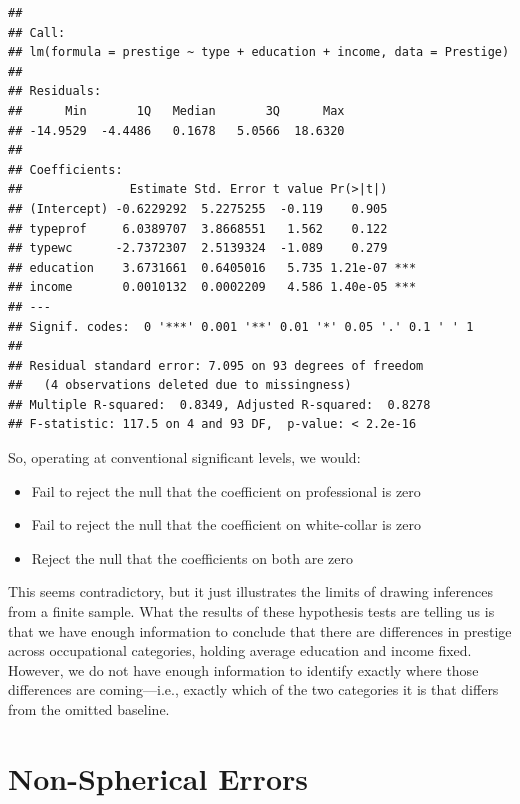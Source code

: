 \documentclass[12pt,oneside,openany]{book}
\providecommand{\tightlist}{%
  \setlength{\itemsep}{0pt}\setlength{\parskip}{0pt}}
\begin{document}
\begin{verbatim}
## 
## Call:
## lm(formula = prestige ~ type + education + income, data = Prestige)
## 
## Residuals:
##      Min       1Q   Median       3Q      Max 
## -14.9529  -4.4486   0.1678   5.0566  18.6320 
## 
## Coefficients:
##               Estimate Std. Error t value Pr(>|t|)    
## (Intercept) -0.6229292  5.2275255  -0.119    0.905    
## typeprof     6.0389707  3.8668551   1.562    0.122    
## typewc      -2.7372307  2.5139324  -1.089    0.279    
## education    3.6731661  0.6405016   5.735 1.21e-07 ***
## income       0.0010132  0.0002209   4.586 1.40e-05 ***
## ---
## Signif. codes:  0 '***' 0.001 '**' 0.01 '*' 0.05 '.' 0.1 ' ' 1
## 
## Residual standard error: 7.095 on 93 degrees of freedom
##   (4 observations deleted due to missingness)
## Multiple R-squared:  0.8349, Adjusted R-squared:  0.8278 
## F-statistic: 117.5 on 4 and 93 DF,  p-value: < 2.2e-16
\end{verbatim}

So, operating at conventional significant levels, we would:

\begin{itemize}
\tightlist
\item
  Fail to reject the null that the coefficient on professional is zero
\item
  Fail to reject the null that the coefficient on white-collar is zero
\item
  Reject the null that the coefficients on both are zero
\end{itemize}

This seems contradictory, but it just illustrates the limits of drawing
inferences from a finite sample. What the results of these hypothesis
tests are telling us is that we have enough information to conclude that
there are differences in prestige across occupational categories,
holding average education and income fixed. However, we do not have
enough information to identify exactly where those differences are
coming---i.e., exactly which of the two categories it is that differs
from the omitted baseline.

\chapter{Non-Spherical Errors}\label{nonspherical}
\end{document}
